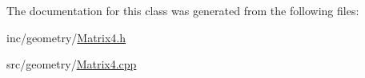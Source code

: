 The documentation for this class was generated from the following files\+:\begin{DoxyCompactItemize}
\item 
inc/geometry/\hyperlink{_matrix4_8h}{Matrix4.\+h}\item 
src/geometry/\hyperlink{_matrix4_8cpp}{Matrix4.\+cpp}\end{DoxyCompactItemize}
